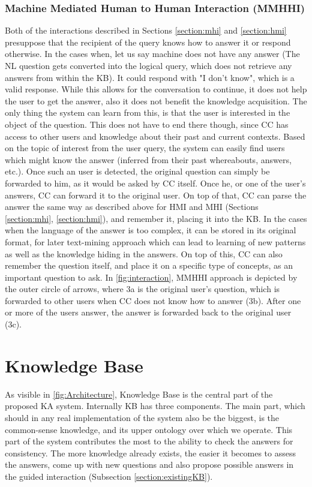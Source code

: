 \subsubsection{Machine Mediated Human to Human Interaction (MMHHI)}
\label{section:mmhhi}
Both of the interactions described in Sections \ref{section:mhi} and 
\ref{section:hmi} presuppose that the recipient of the query knows how to
answer it or respond otherwise. In the cases when, let us say machine does not
have any answer (The NL question gets converted into the logical query, which 
does not retrieve any answers from within the KB). It could respond with 
"I don't know", which is a valid response.
While this allows for the conversation to continue, it does not help the user to get the answer, also it does not benefit the knowledge acquisition. The only 
thing the system can learn from this, is that the user is interested in the object
of the question. This does not have to end there though, since CC has access to
other users and knowledge about their past and current contexts. Based on the
topic of interest from the user query, the system can easily find users which
might know the answer (inferred from their past whereabouts, answers, etc.).
Once such an user is detected, the original question can simply be forwarded to
him, as it would be asked by CC itself. Once he, or one of the user's answers,
CC can forward it to the original user. On top of that, CC can parse the answer
the same way as described above for HMI and MHI (Sections \ref{section:mhi},
\ref{section:hmi}), and remember it, placing it into the KB. In the cases when
the language of the answer is too complex, it can be stored in its original
format, for later text-mining approach which can lead to learning of new patterns as well as the knowledge hiding in the answers. On top of this, CC can also
remember the question itself, and place it on a specific type of concepts, as an
important question to ask. In \autoref{fig:interaction},
MMHHI approach is depicted by the outer circle of arrows, where 3a is the original user's question, which is forwarded to other users when CC does not know how to 
answer (3b). After one or more of the users answer, the answer is forwarded back
to the original user (3c).

\section{Knowledge Base}
\label{section:kb}
As visible in \autoref{fig:Architecture}, Knowledge Base is the central part
of the proposed KA system. Internally KB has three components. The main part, 
which should in any real implementation of the system also be the biggest, is 
the common-sense knowledge, and its upper ontology over which we operate. 
This part of the system contributes the most to the ability to check the 
answers for consistency. The more knowledge already exists, the easier it becomes to assess the answers, come up with new questions and also propose possible
answers in the guided interaction (Subsection \ref{section:existingKB}).

